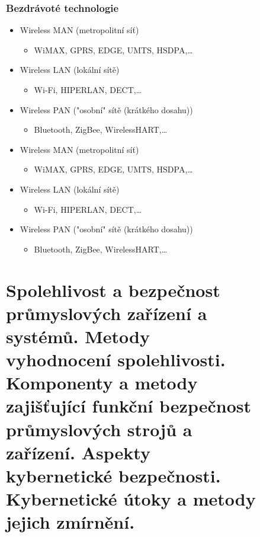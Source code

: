 \begin{figure}[h]
\subsubsection*{Bezdrávoté technologie}
\begin{itemize}
  \item Wireless MAN (metropolitní síť) \begin{itemize}
    \item WiMAX, GPRS, EDGE, UMTS, HSDPA,\dots
  \end{itemize}
  \item Wireless LAN (lokální sítě) \begin{itemize}
    \item Wi-Fi, HIPERLAN, DECT,\dots
  \end{itemize}
  \item Wireless PAN ("osobní" sítě (krátkého dosahu)) \begin{itemize}
    \item Bluetooth, ZigBee, WirelessHART,\dots
  \end{itemize}
    \item Wireless MAN (metropolitní síť) \begin{itemize}
              \item WiMAX, GPRS, EDGE, UMTS, HSDPA,\dots
          \end{itemize}
    \item Wireless LAN (lokální sítě) \begin{itemize}
              \item Wi-Fi, HIPERLAN, DECT,\dots
          \end{itemize}
    \item Wireless PAN ("osobní" sítě (krátkého dosahu)) \begin{itemize}
              \item Bluetooth, ZigBee, WirelessHART,\dots
          \end{itemize}
\end{itemize}

\section{Spolehlivost a bezpečnost průmyslových zařízení a systémů. Metody vyhodnocení spolehlivosti. Komponenty a metody zajišťující funkční bezpečnost průmyslových strojů a zařízení. Aspekty kybernetické bezpečnosti. Kybernetické útoky a metody jejich zmírnění.}


\end{figure}
